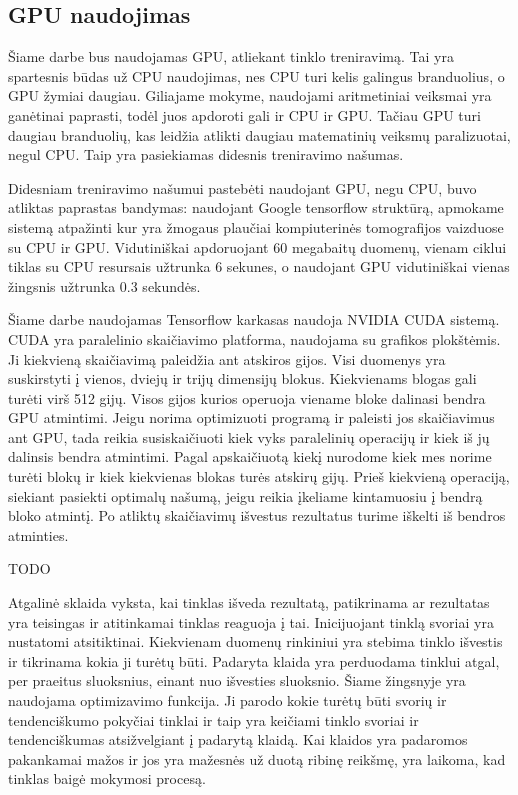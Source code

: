 \documentclass{VUMIFInfKursinis}
\begin{document}
\subsection{GPU naudojimas}
\par
Šiame darbe bus naudojamas GPU, atliekant tinklo treniravimą. Tai yra spartesnis būdas už CPU
naudojimas, nes CPU turi kelis galingus branduolius, o GPU žymiai daugiau. Giliajame mokyme,
naudojami aritmetiniai veiksmai yra ganėtinai paprasti, todėl juos apdoroti gali ir CPU ir GPU.
Tačiau GPU turi daugiau branduolių, kas leidžia atlikti daugiau matematinių veiksmų paralizuotai,
negul CPU. Taip yra pasiekiamas didesnis treniravimo našumas.
\par
Didesniam treniravimo našumui pastebėti naudojant GPU, negu CPU, buvo atliktas paprastas bandymas:
naudojant Google tensorflow struktūrą, apmokame sistemą atpažinti kur yra žmogaus plaučiai kompiuterinės
tomografijos vaizduose su CPU ir GPU. Vidutiniškai apdoruojant 60 megabaitų duomenų, vienam ciklui
tiklas su CPU resursais užtrunka 6 sekunes, o naudojant GPU vidutiniškai vienas žingsnis užtrunka
0.3 sekundės.
\par
Šiame darbe naudojamas Tensorflow karkasas naudoja NVIDIA CUDA sistemą.
CUDA yra paralelinio skaičiavimo platforma, naudojama su grafikos plokštėmis.
Ji kiekvieną skaičiavimą paleidžia ant atskiros gijos. Visi duomenys yra suskirstyti
į vienos, dviejų ir trijų dimensijų blokus. Kiekvienams blogas gali turėti virš 512
gijų. Visos gijos kurios operuoja viename bloke dalinasi bendra GPU atmintimi.
Jeigu norima optimizuoti programą ir paleisti jos skaičiavimus ant GPU, tada reikia
susiskaičiuoti kiek vyks paralelinių operacijų ir kiek iš jų dalinsis bendra atmintimi.
Pagal apskaičiuotą kiekį nurodome kiek mes norime turėti blokų ir kiek kiekvienas blokas
turės atskirų gijų. Prieš kiekvieną operaciją, siekiant pasiekti optimalų našumą, jeigu
reikia įkeliame kintamuosiu į bendrą bloko atmintį. Po atliktų skaičiavimų išvestus
rezultatus turime iškelti iš bendros atminties.

TODO

Atgalinė sklaida vyksta, kai tinklas išveda rezultatą, patikrinama ar
rezultatas yra teisingas ir atitinkamai tinklas reaguoja į tai. Inicijuojant tinklą svoriai yra
nustatomi atsitiktinai. Kiekvienam duomenų rinkiniui yra stebima tinklo išvestis ir tikrinama kokia
ji turėtų būti. Padaryta klaida yra perduodama tinklui atgal, per praeitus sluoksnius, einant nuo
išvesties sluoksnio. Šiame žingsnyje yra naudojama optimizavimo funkcija. Ji parodo kokie turėtų būti
svorių ir tendenciškumo pokyčiai tinklai ir taip yra
keičiami tinklo svoriai ir tendenciškumas atsižvelgiant į padarytą klaidą. Kai klaidos
yra padaromos pakankamai mažos ir jos yra mažesnės už duotą ribinę reikšmę, yra laikoma, kad tinklas
baigė mokymosi procesą.
\end{document}
